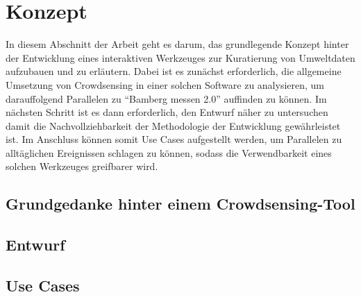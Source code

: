 \chapter{Konzept} %
In diesem Abschnitt der Arbeit geht es darum, das grundlegende Konzept hinter der Entwicklung eines interaktiven Werkzeuges zur Kuratierung 
von Umweltdaten aufzubauen und zu erläutern. Dabei ist es zunächst erforderlich, die allgemeine Umsetzung von Crowdsensing in einer solchen Software zu analysieren, um 
darauffolgend Parallelen zu \enquote{Bamberg messen 2.0} auffinden zu können. \newline Im nächsten Schritt ist es dann erforderlich, den Entwurf näher zu untersuchen damit 
die Nachvollziehbarkeit der Methodologie der Entwicklung gewährleistet ist. Im Anschluss können somit Use Cases aufgestellt werden, um Parallelen zu alltäglichen Ereignissen 
schlagen zu können, sodass die Verwendbarkeit eines solchen Werkzeuges greifbarer wird.
\section{Grundgedanke hinter einem Crowdsensing-Tool}

\section{Entwurf}

\section{Use Cases}